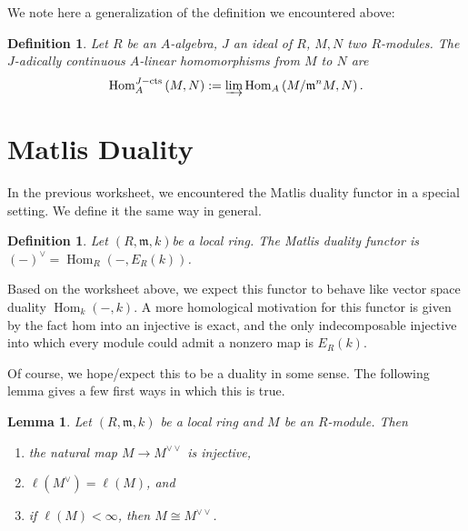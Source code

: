 \documentclass[11pt]{book}
\newtheorem{lemma}[theorem]{Lemma}
\newtheorem{definition}[theorem]{Definition}
\numberwithin{equation}{section}
\numberwithin{theorem}{chapter}
\theoremstyle{definition}
\newtheorem*{basic properties}{Basic Properties}
\newtheorem*{Important Remark}{Important Remark}
\theoremstyle{remark}
\newcommand{\m}{\mathfrak{m}}
\newcommand{\Hom}{\operatorname{Hom}}
\begin{document}
We note here a generalization of the definition we encountered above:

\begin{definition}\index{$\Hom_A^{J-\textrm{cts}}$} Let $R$ be an $A$-algebra, $J$ an ideal of $R$, $M,N$ two $R$-modules. The \emph{$J$-adically continuous $A$-linear homomorphisms from $M$ to $N$} are 
	$$\Hom_A^{J-\textrm{cts}} \left( M, N \right) := \varinjlim \Hom_A \left( M/\m^n M, N \right).$$
\end{definition}


\section{Matlis Duality}

In the previous worksheet, we encountered the Matlis duality functor in a special setting. We define it the same way in general.

\begin{definition} Let $(R,\m,k)$be a local ring. The \emph{Matlis duality functor} is $(-)^{\vee} = \Hom_R(-,E_R(k))$.
\end{definition}

Based on the worksheet above, we expect this functor to behave like vector space duality $\Hom_k(-,k)$. A more homological motivation for this functor is given by the fact hom into an injective is exact, and the only indecomposable injective into which every module could admit a nonzero map is $E_R(k)$.

Of course, we hope/expect this to be a duality in some sense. The following lemma gives a few first ways in which this is true.


\begin{lemma}
	Let $(R,\m, k)$ be a local ring and $M$ be an $R$-module. Then
	\begin{enumerate}
		\item the natural map $M\to M^{\vee\vee}$ is injective,
		\item $\ell(M^{\vee}) = \ell(M)$, and
		\item if $\ell(M)<\infty$, then $M\cong M^{\vee\vee}$.
	\end{enumerate} 
\end{lemma}
\end{document}
